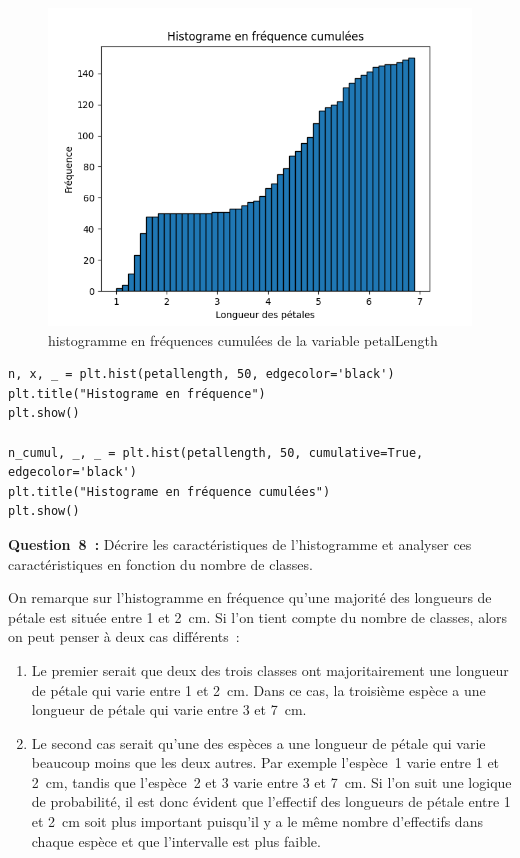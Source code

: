 \begin{figure}[!h]
\begin{minipage}{.48\linewidth}
\begin{center}
            \includegraphics[width=1.1\textwidth]{img/Figure_4.png}
            \caption{\label{fig:histogramme_freq-petalLength-cumul}histogramme en fréquences cumulées de la variable petalLength}  
        \end{center}
    \end{minipage}
\end{figure}

\begin{lstlisting}[style=myPython, caption=Code python pour tracer les histogrammes, frame=lines]
n, x, _ = plt.hist(petallength, 50, edgecolor='black')
plt.title("Histograme en fréquence")
plt.show()

n_cumul, _, _ = plt.hist(petallength, 50, cumulative=True, edgecolor='black')
plt.title("Histograme en fréquence cumulées")
plt.show()
\end{lstlisting}

\vspace{.5cm}


\noindent
\textbf{Question~8~:} Décrire les caractéristiques de l’histogramme et analyser ces caractéristiques en fonction du nombre de classes.
\vspace{.3cm}

On remarque sur l'histogramme en fréquence qu'une majorité des longueurs de pétale est située entre 1 et 2~cm. Si l'on tient compte du nombre de classes, alors on peut penser à deux cas différents~: 
\begin{enumerate}
    \item Le premier serait que deux des trois classes ont majoritairement une longueur de pétale qui varie entre 1 et 2~cm. Dans ce cas, la troisième espèce a une longueur de pétale qui varie entre 3 et 7~cm.
    \item Le second cas serait qu'une des espèces a une longueur de pétale qui varie beaucoup moins que les deux autres. Par exemple l'espèce~1 varie entre 1 et 2~cm, tandis que l'espèce~2 et 3 varie entre 3 et 7~cm. Si l'on suit une 
          logique de probabilité, il est donc évident que l'effectif des longueurs de pétale entre 1 et 2~cm soit plus important puisqu’il y a le même nombre d'effectifs dans chaque espèce et que l'intervalle est plus faible.
\end{enumerate}

